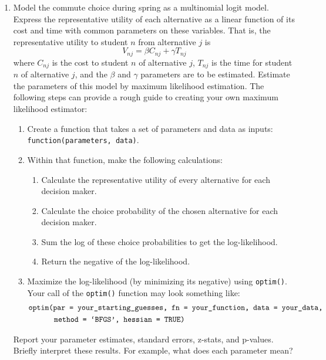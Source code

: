 \documentclass[11pt,letterpaper]{article}\usepackage[]{graphicx}\usepackage[]{color}
\begin{document}
\begin{enumerate}[label=\alph*., leftmargin=*]
	\item Model the commute choice during spring as a multinomial logit model. Express the representative utility of each alternative as a linear function of its cost and time with common parameters on these variables. That is, the representative utility to student $n$ from alternative $j$ is
	$$V_{nj} = \beta C_{nj} + \gamma T_{nj}$$
	where $C_{nj}$ is the cost to student $n$ of alternative $j$, $T_{nj}$ is the time for student $n$ of alternative $j$, and the $\beta$ and $\gamma$ parameters are to be estimated. Estimate the parameters of this model by maximum likelihood estimation. The following steps can provide a rough guide to creating your own maximum likelihood estimator:
	\begin{enumerate}[label=\Roman*.]
		\item Create a function that takes a set of parameters and data as inputs: \texttt{function(parameters, data)}.
		\item Within that function, make the following calculations:
		\begin{enumerate}[label=\roman*.]
			\item Calculate the representative utility of every alternative for each decision maker.
			\item Calculate the choice probability of the chosen alternative for each decision maker.
			\item Sum the log of these choice probabilities to get the log-likelihood.
			\item Return the negative of the log-likelihood.
		\end{enumerate}
		\item Maximize the log-likelihood (by minimizing its negative) using \texttt{optim()}. Your call of the \texttt{optim()} function may look something like:
		\begin{align*}
			&\text{\texttt{optim(par = your\_starting\_guesses, fn = your\_function, data = your\_data,}} \\
			& \qquad \quad \; \text{\texttt{method = `BFGS', hessian = TRUE)}}
		\end{align*}
	\end{enumerate}
	Report your parameter estimates, standard errors, z-stats, and p-values. Briefly interpret these results. For example, what does each parameter mean?


\end{enumerate}
\end{document}

